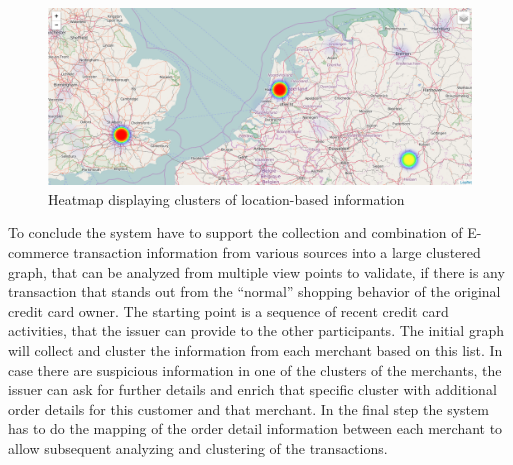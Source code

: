 \begin{figure}[H]
  \centering
  \includegraphics[width=0.9\columnwidth]{images/Heatmap.png}
  \caption{Heatmap displaying clusters of location-based information}
\label{fig:images_map_heatmap}
\end{figure}

To conclude the system have to support the collection and combination of \gls{E-commerce} transaction information from various sources into a large clustered graph, that can be analyzed from multiple view points to validate, if there is any transaction that stands out from the ``normal'' shopping behavior of the original credit card owner. The starting point is a sequence of recent credit card activities, that the issuer can provide to the other participants. The initial graph will collect and cluster the information from each merchant based on this list. In case there are suspicious information in one of the clusters of the merchants, the issuer can ask for further details and enrich that specific cluster with additional order details for this customer and that merchant. In the final step the system has to do the mapping of the order detail information between each merchant to allow subsequent analyzing and clustering of the transactions.

